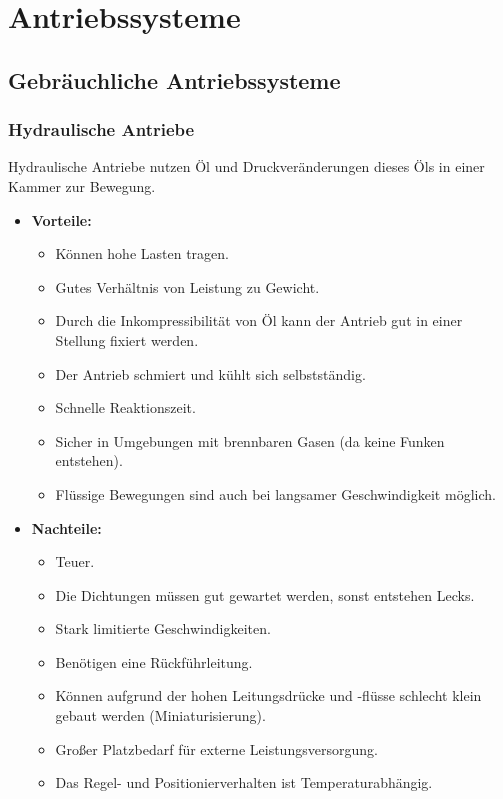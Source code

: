 \chapter{Antriebssysteme}
	\section{Gebräuchliche Antriebssysteme}
		\subsection{Hydraulische Antriebe}
			Hydraulische Antriebe nutzen Öl und Druckveränderungen dieses Öls in einer Kammer zur Bewegung.
			
			\begin{itemize}
				\item \textbf{Vorteile:}
					\begin{itemize}
						\item Können hohe Lasten tragen.
						\item Gutes Verhältnis von Leistung zu Gewicht.
						\item Durch die Inkompressibilität von Öl kann der Antrieb gut in einer Stellung fixiert werden.
						\item Der Antrieb schmiert und kühlt sich selbstständig.
						\item Schnelle Reaktionszeit.
						\item Sicher in Umgebungen mit brennbaren Gasen (da keine Funken entstehen).
						\item Flüssige Bewegungen sind auch bei langsamer Geschwindigkeit möglich.
					\end{itemize}
				\item \textbf{Nachteile:}
					\begin{itemize}
						\item Teuer.
						\item Die Dichtungen müssen gut gewartet werden, sonst entstehen Lecks.
						\item Stark limitierte Geschwindigkeiten.
						\item Benötigen eine Rückführleitung.
						\item Können aufgrund der hohen Leitungsdrücke und -flüsse schlecht klein gebaut werden (Miniaturisierung).
						\item Großer Platzbedarf für externe Leistungsversorgung.
						\item Das Regel- und Positionierverhalten ist Temperaturabhängig.
					\end{itemize}
			\end{itemize}
		
